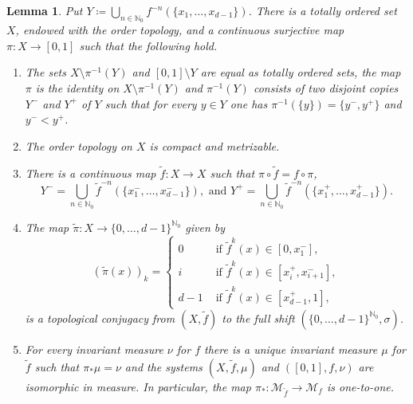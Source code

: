 \documentclass[12pt]{amsart}
\numberwithin{equation}{section} %
\numberwithin{figure}{section} %
\theoremstyle{plain}
\newtheorem{lemm}[prop]{Lemma}
\theoremstyle{definition}
\theoremstyle{remark}
\theoremstyle{citing}
\newcommand{\N}{\mathbb{N}}
\renewcommand{\=}{\coloneqq}
\begin{document}
\begin{lemm}\label{extension lemma}
     Put $Y\= \bigcup_{n\in\N_0} f^{-n}(\{x_1,\ldots,x_{d-1}\})$. There is a totally ordered set $X$, endowed with the order topology, and a continuous surjective map $\pi: X\to[0,1]$ such that the following hold.
    \begin{enumerate}
        \item[1.] The sets $X\setminus \pi^{-1}(Y)$ and $[0,1]\setminus Y$ are equal as totally ordered sets, the map $\pi$ is the identity on $X\setminus \pi^{-1}(Y)$ and $\pi^{-1}(Y)$ consists of two disjoint copies $Y^{-}$ and $Y^{+}$ of $Y$ such that for every $y\in Y$ one has $\pi^{-1}(\{y\})=\{y^-,y^+\}$ and $y^-<y^+$.

        \item[2.] The order topology on $X$ is compact and metrizable.

        \item[3.] There is a continuous map $\widetilde{f}: X\to X$ such that $\pi\circ \widetilde{f} = f\circ\pi$,
        \begin{equation*}
            Y^- = \bigcup_{n\in\N_0}\widetilde{f}^{-n}(\{x_1^-,\ldots, x_{d-1}^-\}), \text{ and } Y^+= \bigcup_{n\in\N_0}\widetilde{f}^{-n}(\{x_1^+,\ldots, x_{d-1}^+\}).
        \end{equation*}

    \item[4.] The map $\widetilde{\pi}:X\to \{0,\ldots,d-1\}^{\N_0}$ given by 
\begin{equation*}
    (\widetilde{\pi}(x))_k= \begin{cases}
        0 & \text{ if }\widetilde{f}^k(x) \in [0,x_1^-],\\
        i & \text{ if }\widetilde{f}^k(x) \in [x_i^+,x_{i+1}^-],\\
        d-1 & \text{ if }\widetilde{f}^k(x)\in [x_{d-1}^+,1],
    \end{cases}
\end{equation*}
   is a topological conjugacy from $(X,\widetilde{f})$ to the full shift $(\{0,\ldots,d-1\}^{\N_0},\sigma)$.

    \item[5.] For every invariant measure $\nu$ for $f$ there is a unique invariant measure $\mu$ for $\widetilde{{f}}$ such that $\pi_*\mu=\nu$ and the systems $(X,\widetilde{f},\mu)$ and $([0,1],f,\nu)$ are isomorphic in measure. In particular, the map $\pi_*:\mathcal{M}_{\widetilde{f}}\to \mathcal{M}_f$ is one-to-one.
    \end{enumerate}
\end{lemm}
\end{document}
